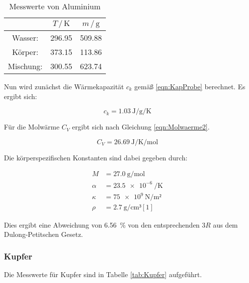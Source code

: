 \begin{table}
\centering
\caption{Messwerte von Aluminium}
\label{tab:Aluminium}
\begin{tabular}{c c c}
\toprule
$ $ & $T \,/\, \si{\kelvin}$& $m \,/\, \si{\gram}$\\
\midrule
  Wasser: & 296.95 & 509.88\\
  Körper: & 373.15 & 113.86\\
Mischung: & 300.55 & 623.74\\
\bottomrule
\end{tabular}
\end{table}

Nun wird zunächst die Wärmekapazität $c_k$ gemäß \eqref{eqn:KapProbe} berechnet. 
Es ergibt sich:

\begin{equation*}
c_k = \SI{1.03}{\joule\per\gram\per\kelvin}
\end{equation*}

Für die Molwärme $C_V$ ergibt sich nach Gleichung \eqref{eqn:Molwaerme2}.

\begin{equation*}
C_V = \SI{26.69}{\joule\per\kelvin\per\mol}
\end{equation*}

Die körperspezifischen Konstanten sind dabei gegeben durch: 

\begin{align*}
M &= \SI{27.0}{\gram\per\mol}\\
\alpha &= \SI{23.5e-6}{\per\kelvin}\\
\kappa &= \SI{75e9}{\newton\per\m²}\\
\rho &= \SI{2.7}{\gram\per\centi\meter³} [1]
\end{align*}

Dies ergibt eine Abweichung von \SI{6.56}{\percent} von den entsprechenden $3R$ aus 
dem Dulong-Petitschen Gesetz. 

\subsubsection{Kupfer}

Die Messwerte für Kupfer sind in Tabelle \ref{tab:Kupfer} aufgeführt.

